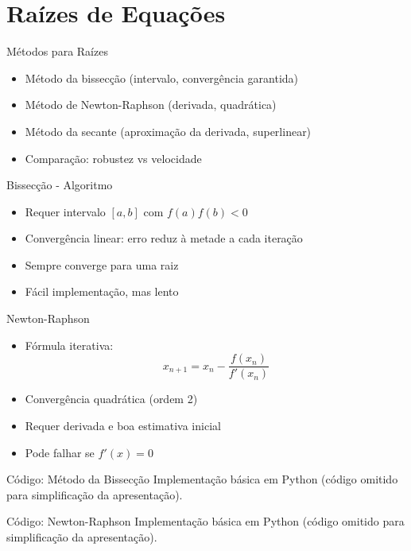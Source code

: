 \documentclass[11pt]{beamer}
\numberwithin{equation}{section}
\begin{document}
\section{Raízes de Equações}
\begin{frame}{Métodos para Raízes}
\begin{itemize}
\item Método da bissecção (intervalo, convergência garantida)
\item Método de Newton-Raphson (derivada, quadrática)
\item Método da secante (aproximação da derivada, superlinear)
\item Comparação: robustez vs velocidade
\end{itemize}
\end{frame}

\begin{frame}{Bissecção - Algoritmo}
\begin{itemize}
\item Requer intervalo $[a,b]$ com $f(a)f(b) < 0$
\item Convergência linear: erro reduz à metade a cada iteração
\item Sempre converge para uma raiz
\item Fácil implementação, mas lento
\end{itemize}
\end{frame}

\begin{frame}{Newton-Raphson}
\begin{itemize}
\item Fórmula iterativa:
\begin{equation}
x_{n+1} = x_n - \frac{f(x_n)}{f'(x_n)}
\end{equation}
\item Convergência quadrática (ordem 2)
\item Requer derivada e boa estimativa inicial
\item Pode falhar se $f'(x) = 0$
\end{itemize}
\end{frame}

\begin{frame}{Código: Método da Bissecção}
\footnotesize
Implementação básica em Python (código omitido para simplificação da apresentação).
\end{frame}

\begin{frame}{Código: Newton-Raphson}
\footnotesize
Implementação básica em Python (código omitido para simplificação da apresentação).
\end{frame}
\end{document}
